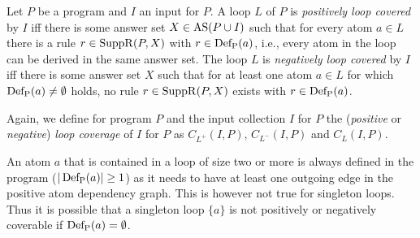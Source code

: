 \begin{definition}
\label{def:loop coverage}
    Let $P$ be a program and $I$ an input for $P$. A loop $L$ of $P$ is \emph{positively loop covered} by $I$ iff there is some answer set \(X \in \operatorname{AS}(P \cup I)\) such that for every atom \(a \in L\) there is a rule \(r \in \operatorname{SuppR}(P, X)\) with \(r \in \operatorname{Def_P}(a)\), i.e., every atom in the loop can be derived in the same answer set.
    The loop $L$ is \emph{negatively loop covered} by $I$ iff there is some answer set $X$ such that for at least one atom \(a \in L\) for which \(\operatorname{Def_P}(a) \neq \emptyset\) holds, no rule \(r \in \operatorname{SuppR}(P, X)\) exists with \(r \in \operatorname{Def_P}(a)\).
\end{definition}

Again, we define for program $P$ and the input collection $I$ for $P$ the (\emph{positive} or \emph{negative}) \emph{loop coverage} of $I$ for $P$ as \(C_{L^+}(I, P)\), \(C_{L^-}(I, P)\) and \(C_{L}(I, P)\).

An atom $a$ that is contained in a loop of size two or more is always defined in the program (\(| \operatorname{Def_P}(a) | \geq 1\)) as it needs to have at least one outgoing edge in the positive atom dependency graph. This is however not true for singleton loops. Thus it is possible that a singleton loop \(\{a\}\) is not positively or negatively coverable if \(\operatorname{Def_P}(a) = \emptyset\).

